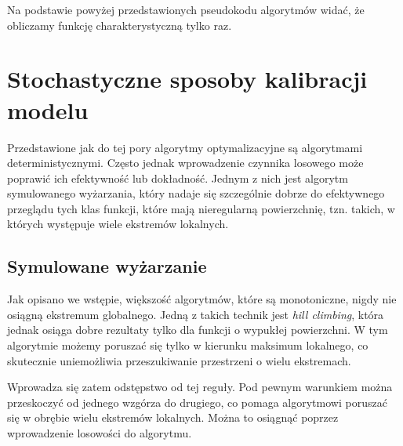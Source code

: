 \documentclass{pracamgr}
\begin{document}
Na podstawie powyżej przedstawionych pseudokodu algorytmów widać, że obliczamy funkcję 
charakterystyczną tylko raz.



\section{Stochastyczne sposoby kalibracji modelu}
Przedstawione jak do tej pory algorytmy optymalizacyjne są algorytmami deterministycznymi.
Często jednak wprowadzenie czynnika losowego może poprawić ich efektywność lub dokładność. Jednym z
nich jest algorytm symulowanego wyżarzania, który nadaje się szczególnie dobrze do efektywnego
przeglądu tych klas funkcji, które mają nieregularną powierzchnię, tzn. takich, w których występuje
wiele ekstremów lokalnych.

\subsection{Symulowane wyżarzanie}

Jak opisano we wstępie, większość algorytmów, które są monotoniczne, nigdy nie osiągną ekstremum
globalnego. Jedną z takich technik jest \textit{hill climbing}, która jednak 
osiąga dobre rezultaty tylko dla funkcji o wypukłej powierzchni. W tym algorytmie możemy poruszać się
tylko w kierunku maksimum lokalnego, co skutecznie uniemożliwia przeszukiwanie przestrzeni o wielu
ekstremach.

Wprowadza się zatem odstępstwo od tej reguły. Pod pewnym warunkiem można przeskoczyć od 
jednego wzgórza do drugiego, co pomaga algorytmowi poruszać się w obrębie wielu ekstremów lokalnych.
Można to osiągnąć poprzez wprowadzenie losowości do algorytmu. 
\end{document}
